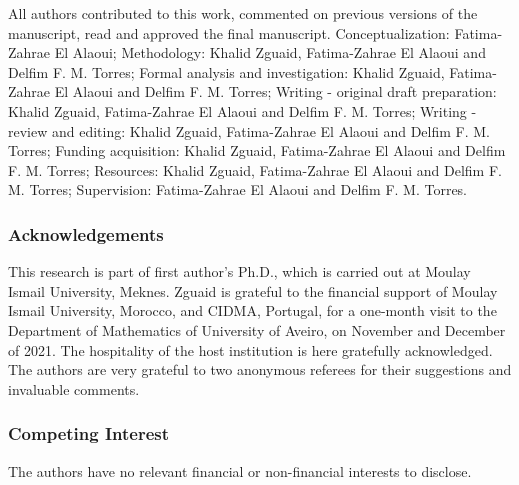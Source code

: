 \documentclass{article}
\begin{document}
All authors contributed to this work,
commented on previous versions of the manuscript, 
read and approved the final manuscript.
Conceptualization: Fatima-Zahrae El Alaoui; 
Methodology: Khalid Zguaid, Fatima-Zahrae El Alaoui and Delfim F. M. Torres; 
Formal analysis and investigation: Khalid Zguaid, Fatima-Zahrae El Alaoui and Delfim F. M. Torres; 
Writing - original draft preparation: Khalid Zguaid, Fatima-Zahrae El Alaoui and Delfim F. M. Torres; 
Writing - review and editing: Khalid Zguaid, Fatima-Zahrae El Alaoui and Delfim F. M. Torres; 
Funding acquisition: Khalid Zguaid, Fatima-Zahrae El Alaoui and Delfim F. M. Torres; 
Resources: Khalid Zguaid, Fatima-Zahrae El Alaoui and Delfim F. M. Torres; 
Supervision: Fatima-Zahrae El Alaoui and Delfim F. M. Torres.

\subsubsection*{Acknowledgements}

This research is part of first author's Ph.D., which is carried out 
at Moulay Ismail University, Meknes. Zguaid is grateful to the 
financial support of Moulay Ismail University, Morocco, and CIDMA, Portugal,
for a one-month visit to the Department of Mathematics of University of Aveiro, 
on November and December of 2021. The hospitality of the host institution 
is here gratefully acknowledged. The authors are very grateful to two anonymous 
referees for their suggestions and invaluable comments.

\subsubsection*{Competing Interest}

The authors have no relevant financial or non-financial interests to disclose.

\end{document}
